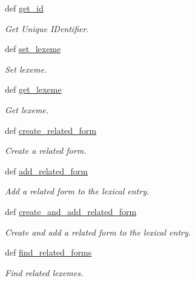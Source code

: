 \begin{DoxyCompactItemize}
def \hyperlink{classlmf_1_1src_1_1core_1_1lexical__entry_1_1_lexical_entry_a337ed7fdab2cabc9dce913920424dd95}{get\+\_\+id}
\begin{DoxyCompactList}\small\item\em Get Unique I\+Dentifier. \end{DoxyCompactList}\item 
def \hyperlink{classlmf_1_1src_1_1core_1_1lexical__entry_1_1_lexical_entry_a0720cfa82decbc27a30d4830c1e8cbf2}{set\+\_\+lexeme}
\begin{DoxyCompactList}\small\item\em Set lexeme. \end{DoxyCompactList}\item 
def \hyperlink{classlmf_1_1src_1_1core_1_1lexical__entry_1_1_lexical_entry_a351a470c736be8b896354d27f56e1833}{get\+\_\+lexeme}
\begin{DoxyCompactList}\small\item\em Get lexeme. \end{DoxyCompactList}\item 
def \hyperlink{classlmf_1_1src_1_1core_1_1lexical__entry_1_1_lexical_entry_ac3b6d197ee90f1aec5b61e24613c091f}{create\+\_\+related\+\_\+form}
\begin{DoxyCompactList}\small\item\em Create a related form. \end{DoxyCompactList}\item 
def \hyperlink{classlmf_1_1src_1_1core_1_1lexical__entry_1_1_lexical_entry_a9078d381fea92a4d1d3f57b391a2b5b7}{add\+\_\+related\+\_\+form}
\begin{DoxyCompactList}\small\item\em Add a related form to the lexical entry. \end{DoxyCompactList}\item 
def \hyperlink{classlmf_1_1src_1_1core_1_1lexical__entry_1_1_lexical_entry_a46576799af0465084051e3c2957afa3c}{create\+\_\+and\+\_\+add\+\_\+related\+\_\+form}
\begin{DoxyCompactList}\small\item\em Create and add a related form to the lexical entry. \end{DoxyCompactList}\item 
def \hyperlink{classlmf_1_1src_1_1core_1_1lexical__entry_1_1_lexical_entry_ac89bb82f0afe4e1566f34379f3a188da}{find\+\_\+related\+\_\+forms}
\begin{DoxyCompactList}\small\item\em Find related lexemes. \end{DoxyCompactList}\item 

\end{DoxyCompactItemize}

